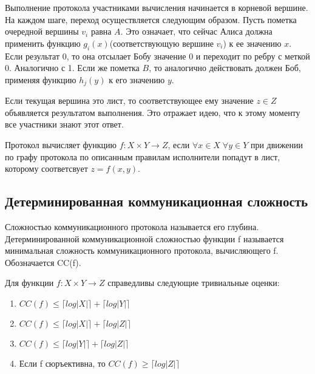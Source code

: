 \documentclass[12pt]{article}
\begin{document}
Выполнение протокола участниками вычисления начинается в корневой вершине.
На каждом шаге, переход осуществляется следующим образом. Пусть пометка очередной вершины $v_i$ равна $A$. Это означает, что сейчас Алиса должна применить функцию $g_i(x)$(соответствующую вершине $v_i$) к ее значению $x$. Если результат 0, то она отсылает Бобу значение 0 и переходит по ребру с меткой 0. Аналогично с 1.
Если же пометка $B$, то аналогично действовать должен Боб, применяя функцию $h_j(y)$ к его значению $y$.

Если текущая вершина это лист, то соответствующее ему значение $z \in Z$ объявляется результатом выполнения.
Это отражает идею, что к этому моменту все участники знают этот ответ.

\begin{Def}
Протокол вычисляет функцию $ f \colon X \times Y \rightarrow Z $, \linebreak
если $ \forall x \in X \; \forall y \in Y $ при движении по графу протокола по описанным правилам исполнители попадут в лист, которому соответсвует $z=f(x,y)$.
\end{Def}

\subsection{Детерминированная коммуникационная сложность}

\begin{Def}
Сложностью коммуникационного протокола называется его глубина.
Детерминированной коммуникационной сложностью функции f называется минимальная сложность коммуникационного протокола, вычисляющего f. Обозначается CC(f).
\end{Def}

\begin{Statement}
Для функции $ f \colon X \times Y \rightarrow Z $ справедливы следующие тривиальные оценки:
    \begin{enumerate}
        \item
        $
            CC(f) \leq
            \lceil log|X| \rceil +
            \lceil log|Y| \rceil
        $
        \item
        $
            CC(f) \leq
            \lceil log|X| \rceil +
            \lceil log|Z| \rceil
        $
        \item
        $
            CC(f) \leq
            \lceil log|Y| \rceil +
            \lceil log|Z| \rceil
        $
        \item
        Если f сюръективна, то $ CC(f) \geq \lceil log|Z| \rceil $
    \end{enumerate}
\end{Statement}
\end{document}
